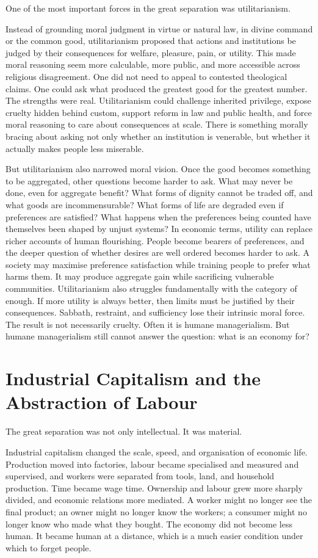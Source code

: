 \documentclass[11pt,a4paper,oneside]{book}
\begin{document}
One of the most important forces in the great separation was utilitarianism.

Instead of grounding moral judgment in virtue or natural law, in divine command or the common good, utilitarianism proposed that actions and institutions be judged by their consequences for welfare, pleasure, pain, or utility. This made moral reasoning seem more calculable, more public, and more accessible across religious disagreement. One did not need to appeal to contested theological claims. One could ask what produced the greatest good for the greatest number. The strengths were real. Utilitarianism could challenge inherited privilege, expose cruelty hidden behind custom, support reform in law and public health, and force moral reasoning to care about consequences at scale. There is something morally bracing about asking not only whether an institution is venerable, but whether it actually makes people less miserable.

But utilitarianism also narrowed moral vision. Once the good becomes something to be aggregated, other questions become harder to ask. What may never be done, even for aggregate benefit? What forms of dignity cannot be traded off, and what goods are incommensurable? What forms of life are degraded even if preferences are satisfied? What happens when the preferences being counted have themselves been shaped by unjust systems? In economic terms, utility can replace richer accounts of human flourishing. People become bearers of preferences, and the deeper question of whether desires are well ordered becomes harder to ask. A society may maximise preference satisfaction while training people to prefer what harms them. It may produce aggregate gain while sacrificing vulnerable communities. Utilitarianism also struggles fundamentally with the category of enough. If more utility is always better, then limits must be justified by their consequences. Sabbath, restraint, and sufficiency lose their intrinsic moral force. The result is not necessarily cruelty. Often it is humane managerialism. But humane managerialism still cannot answer the question: what is an economy for?

\section*{Industrial Capitalism and the Abstraction of Labour}

The great separation was not only intellectual. It was material.

Industrial capitalism changed the scale, speed, and organisation of economic life. Production moved into factories, labour became specialised and measured and supervised, and workers were separated from tools, land, and household production. Time became wage time. Ownership and labour grew more sharply divided, and economic relations more mediated. A worker might no longer see the final product; an owner might no longer know the workers; a consumer might no longer know who made what they bought. The economy did not become less human. It became human at a distance, which is a much easier condition under which to forget people.
\end{document}
